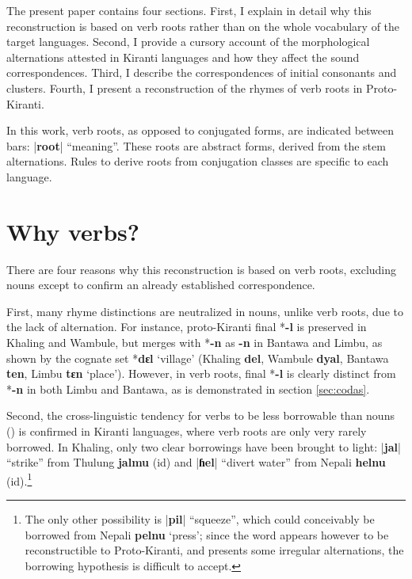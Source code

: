 \documentclass[oldfontcommands,oneside,a4paper,11pt]{article}
\newcommand{\ipa}[1]{\textbf{{\phon\mbox{#1}}}} %
\newcommand{\dhatu}[2]{|\ipa{#1}| ``#2''}
\begin{document}
The present paper contains four sections. First, I explain in detail why this reconstruction is based on verb roots rather than on the whole vocabulary of the target languages. Second, I provide a cursory account of the morphological alternations attested in Kiranti languages and how they affect the sound correspondences. Third, I describe the correspondences of initial consonants and clusters. Fourth, I present a reconstruction of the rhymes of verb roots in Proto-Kiranti.

In this work, verb roots, as opposed to conjugated forms, are indicated between bars: \dhatu{root}{meaning}. These roots are abstract forms, derived from the stem alternations. Rules to derive roots from conjugation classes are specific to each language.

\section{Why verbs?} \label{sec:why}

There are four reasons why this reconstruction is based on verb roots, excluding nouns except to confirm an already established correspondence.

First,  many rhyme distinctions are neutralized in nouns, unlike verb roots, due to the lack of alternation. For instance, proto-Kiranti final *\ipa{-l} is preserved in Khaling and Wambule, but merges with *\ipa{-n} as \ipa{-n} in Bantawa and Limbu, as shown by the cognate set *\ipa{dɛl} `village' (Khaling \ipa{del}, Wambule \ipa{dyal}, Bantawa \ipa{ten}, Limbu \ipa{tɛn} `place'). However, in verb roots, final *\ipa{-l} is clearly distinct from *\ipa{-n} in both Limbu and Bantawa, as is demonstrated in section \ref{sec:codas}.

Second, the cross-linguistic tendency for verbs to be less borrowable than nouns (\citealt{wohlgemuth09verbal}) is confirmed in Kiranti languages, where verb roots are only very rarely borrowed. In Khaling, only two clear borrowings have been brought to light: \dhatu{jal}{strike} from Thulung \ipa{jalmu}  (id) and \dhatu{ɦel}{divert water} from Nepali \ipa{helnu} (id).\footnote{The only other possibility is  \dhatu{pil}{squeeze}, which could conceivably be borrowed from Nepali \ipa{pelnu} `press'; since the word appears however to be reconstructible to Proto-Kiranti, and presents some irregular alternations, the borrowing hypothesis is difficult to accept.} 
\end{document}

